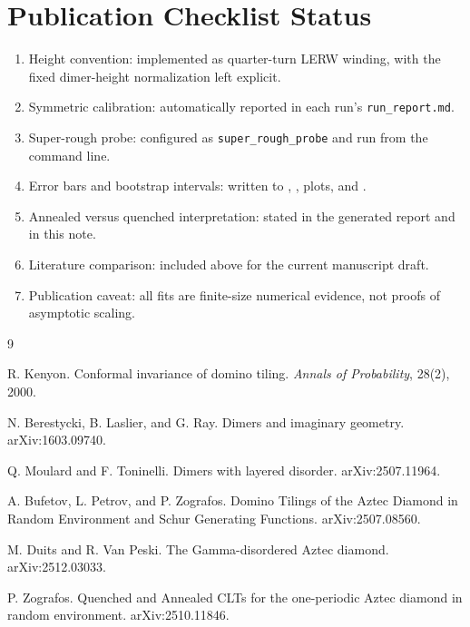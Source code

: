 \documentclass[11pt]{article}
\begin{document}
\section{Publication Checklist Status}

\begin{enumerate}[leftmargin=1.6em]
  \item Height convention: implemented as quarter-turn LERW winding, with the
        fixed dimer-height normalization left explicit.
  \item Symmetric calibration: automatically reported in each run's
        \texttt{run\_report.md}.
  \item Super-rough probe: configured as \texttt{super\_rough\_probe} and run
        from the command line.
  \item Error bars and bootstrap intervals: written to ,
        , plots, and .
  \item Annealed versus quenched interpretation: stated in the generated report
        and in this note.
  \item Literature comparison: included above for the current manuscript draft.
  \item Publication caveat: all fits are finite-size numerical evidence, not
        proofs of asymptotic scaling.
\end{enumerate}

\begin{thebibliography}{9}

R. Kenyon.
\newblock Conformal invariance of domino tiling.
\newblock \emph{Annals of Probability}, 28(2), 2000.

N. Berestycki, B. Laslier, and G. Ray.
\newblock Dimers and imaginary geometry.
\newblock arXiv:1603.09740.

Q. Moulard and F. Toninelli.
\newblock Dimers with layered disorder.
\newblock arXiv:2507.11964.

A. Bufetov, L. Petrov, and P. Zografos.
\newblock Domino Tilings of the Aztec Diamond in Random Environment and Schur
Generating Functions.
\newblock arXiv:2507.08560.

M. Duits and R. Van Peski.
\newblock The Gamma-disordered Aztec diamond.
\newblock arXiv:2512.03033.

P. Zografos.
\newblock Quenched and Annealed CLTs for the one-periodic Aztec diamond in
random environment.
\newblock arXiv:2510.11846.

\end{thebibliography}
\end{document}
